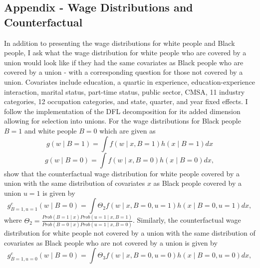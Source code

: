 \documentclass[11pt]{article}
\begin{document}
\subsection{Appendix - Wage Distributions and Counterfactual}
In addition to presenting the wage distributions for white people and Black people, I ask what the wage distribution for white people who are covered by a union would look like if they had the same covariates as Black people who are covered by a union - with a corresponding question for those not covered by a union. Covariates include education, a quartic in experience, education-experience interaction, marital status, part-time status, public sector, CMSA, 11 industry categories, 12 occupation categories, and state, quarter, and year fixed effects. I follow the \citet{heywoodparent2012} implementation of the DFL decomposition for its added dimension allowing for selection into unions. For the wage distributions for Black people $B = 1$ and white people $B = 0$ which are given as 
\begin{equation}
    g(w\mid B = 1) = \int f(w\mid x, B = 1) h(x \mid B = 1) dx
\end{equation}
\begin{equation}
    g(w\mid B = 0) = \int f(w\mid x, B = 0) h(x \mid B = 0) dx,
\end{equation}
\citet{heywoodparent2012} show that the counterfactual wage distribution for white people covered by a union with the same distribution of covariates $x$ as Black people covered by a union $u = 1$ is given by
\begin{equation}
g^c_{B=1, u = 1}(w\mid B = 0) = \int \Theta_2 f(w\mid x, B = 0, u = 1)h(x\mid B = 0, u = 1)dx,
\end{equation}
where $\Theta_2 = \frac{Prob(B = 1\mid x) Prob(u = 1\mid x, B = 1)}{Prob(B = 0\mid x)Prob(u = 1\mid x, B = 0)}$. 
Similarly, the counterfactual wage distribution for white people not covered by a union with the same distribution of covariates as Black people who are not covered by a union is given by
\begin{equation}
g^c_{B=1, u = 0}(w\mid B = 0) = \int \Theta_3 f(w\mid x, B = 0, u = 0)h(x\mid B = 0, u = 0)dx,
\end{equation}
\end{document}
